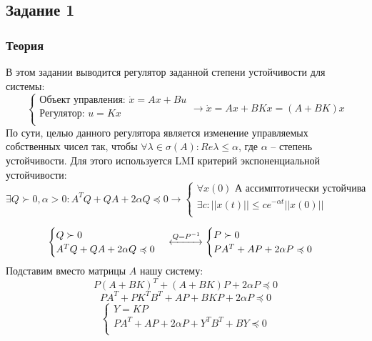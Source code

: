 \subsection{Задание 1}
\subsubsection{Теория}
В этом задании выводится регулятор заданной степени устойчивости для системы:
\[
        \begin{cases}
                \text{Объект управления: }\dot{x} = A x + Bu \\
                \text{Регулятор: }u = K x \\
        \end{cases} \rightarrow
        \dot{x} = A x + BKx = (A+BK)x
\]
По сути, целью данного регулятора является изменение управляемых собственных чисел так, чтобы \(\forall \lambda \in \sigma(A): Re{\lambda} \leq \alpha\), где \(\alpha\) -- степень устойчивости.
Для этого используется LMI критерий экспоненциальной устойчивости:
\[ \exists Q \succ 0 , \alpha > 0 :  A^TQ + QA + 2 \alpha Q \preccurlyeq 0 \rightarrow
\begin{cases}
    \text{\(\forall x(0)\) А ассимптотически устойчива}\\
    \exists c :  ||x(t)|| \le  c e^{-\alpha t} ||x(0)|| \\
\end{cases}
\]

\[      \begin{cases}
                Q \succ 0\\
                A^TQ + QA + 2 \alpha Q \preccurlyeq 0 \\
        \end{cases} \xleftrightarrow{Q = P^{-1}}
        \begin{cases}
                P \succ 0\\
                PA^T + AP + 2 \alpha P \preccurlyeq 0\\
        \end{cases} 
\]
Подставим вместо матрицы \(A\) нашу систему:
\[P(A+BK)^T + (A+BK)P + 2 \alpha P \preccurlyeq 0\]
\[P A^T + P K^T B^T + AP + BKP + 2 \alpha P \preccurlyeq 0\]
\[
        \begin{cases}
                Y = KP\\
                PA^T + AP + 2 \alpha P + Y^T B^T + BY \preccurlyeq 0  \\
        \end{cases} 
\]

